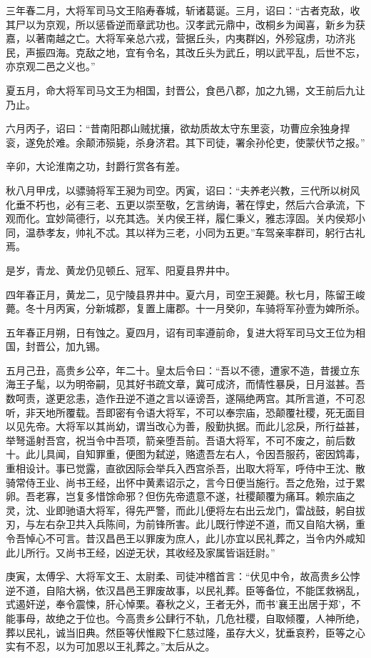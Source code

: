 \documentclass[12pt,UTF8]{ctexbook}
\begin{document}
三年春二月，大将军司马文王陷寿春城，斩诸葛诞。三月，诏曰：“古者克敌，收其尸以为京观，所以惩昏逆而章武功也。汉孝武元鼎中，改桐乡为闻喜，新乡为获嘉，以著南越之亡。大将军亲总六戎，营据丘头，内夷群凶，外殄寇虏，功济兆民，声振四海。克敌之地，宜有令名，其改丘头为武丘，明以武平乱，后世不忘，亦京观二邑之义也。”

夏五月，命大将军司马文王为相国，封晋公，食邑八郡，加之九锡，文王前后九让乃止。

六月丙子，诏曰：“昔南阳郡山贼扰攘，欲劫质故太守东里衮，功曹应余独身捍衮，遂免於难。余颠沛殒毙，杀身济君。其下司徒，署余孙伦吏，使蒙伏节之报。”

辛卯，大论淮南之功，封爵行赏各有差。

秋八月甲戌，以骠骑将军王昶为司空。丙寅，诏曰：“夫养老兴教，三代所以树风化垂不朽也，必有三老、五更以崇至敬，乞言纳诲，著在惇史，然后六合承流，下观而化。宜妙简德行，以充其选。关内侯王祥，履仁秉义，雅志淳固。关内侯郑小同，温恭孝友，帅礼不忒。其以祥为三老，小同为五更。”车驾亲率群司，躬行古礼焉。

是岁，青龙、黄龙仍见顿丘、冠军、阳夏县界井中。

四年春正月，黄龙二，见宁陵县界井中。夏六月，司空王昶薨。秋七月，陈留王峻薨。冬十月丙寅，分新城郡，复置上庸郡。十一月癸卯，车骑将军孙壹为婢所杀。

五年春正月朔，日有蚀之。夏四月，诏有司率遵前命，复进大将军司马文王位为相国，封晋公，加九锡。

五月己丑，高贵乡公卒，年二十。皇太后令曰：“吾以不德，遭家不造，昔援立东海王子髦，以为明帝嗣，见其好书疏文章，冀可成济，而情性暴戾，日月滋甚。吾数呵责，遂更忿恚，造作丑逆不道之言以诬谤吾，遂隔绝两宫。其所言道，不可忍听，非天地所覆载。吾即密有令语大将军，不可以奉宗庙，恐颠覆社稷，死无面目以见先帝。大将军以其尚幼，谓当改心为善，殷勤执据。而此儿忿戾，所行益甚，举弩遥射吾宫，祝当令中吾项，箭亲堕吾前。吾语大将军，不可不废之，前后数十。此儿具闻，自知罪重，便图为弑逆，赂遗吾左右人，令因吾服药，密因鸩毒，重相设计。事已觉露，直欲因际会举兵入西宫杀吾，出取大将军，呼侍中王沈、散骑常侍王业、尚书王经，出怀中黄素诏示之，言今日便当施行。吾之危殆，过于累卵。吾老寡，岂复多惜馀命邪？但伤先帝遗意不遂，社稷颠覆为痛耳。赖宗庙之灵，沈、业即驰语大将军，得先严警，而此儿便将左右出云龙门，雷战鼓，躬自拔刃，与左右杂卫共入兵陈间，为前锋所害。此儿既行悖逆不道，而又自陷大祸，重令吾悼心不可言。昔汉昌邑王以罪废为庶人，此儿亦宜以民礼葬之，当令内外咸知此儿所行。又尚书王经，凶逆无状，其收经及家属皆诣廷尉。”

庚寅，太傅孚、大将军文王、太尉柔、司徒冲稽首言：“伏见中令，故高贵乡公悖逆不道，自陷大祸，依汉昌邑王罪废故事，以民礼葬。臣等备位，不能匡救祸乱，式遏奸逆，奉令震悚，肝心悼栗。春秋之义，王者无外，而书'襄王出居于郑'，不能事母，故绝之于位也。今高贵乡公肆行不轨，几危社稷，自取倾覆，人神所绝，葬以民礼，诚当旧典。然臣等伏惟殿下仁慈过隆，虽存大义，犹垂哀矜，臣等之心实有不忍，以为可加恩以王礼葬之。”太后从之。
\end{document}
